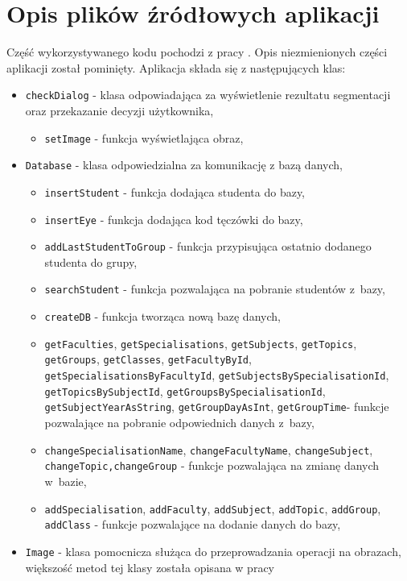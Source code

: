 \chapter{Opis plików źródłowych aplikacji}
\label{cha:opiskodow}

Część wykorzystywanego kodu pochodzi z pracy \cite{Gl11}. Opis niezmienionych części aplikacji został pominięty. Aplikacja składa się z następujących klas:
\begin{itemize}
\item \verb!checkDialog! - klasa odpowiadająca za wyświetlenie rezultatu segmentacji oraz przekazanie decyzji użytkownika,
\begin{itemize}
\item \verb!setImage! - funkcja wyświetlająca obraz,
\end{itemize}
\item \verb!Database! - klasa odpowiedzialna za komunikację z bazą danych,
\begin{itemize}
\item \verb!insertStudent! - funkcja dodająca studenta do bazy,
\item \verb!insertEye! - funkcja dodająca kod tęczówki do bazy,
\item \verb!addLastStudentToGroup! - funkcja przypisująca ostatnio dodanego studenta do grupy,
\item \verb!searchStudent! - funkcja pozwalająca na pobranie studentów z~bazy,
\item \verb!createDB! - funkcja tworząca nową bazę danych,
\item \verb!getFaculties!, \verb!getSpecialisations!, \verb!getSubjects!, \verb!getTopics!, \verb!getGroups!, \verb!getClasses!, \verb!getFacultyById!, \verb!getSpecialisationsByFacultyId!, \verb!getSubjectsBySpecialisationId!, \verb!getTopicsBySubjectId!, \verb!getGroupsBySpecialisationId!, \verb!getSubjectYearAsString!, \verb!getGroupDayAsInt!, \verb!getGroupTime!- funkcje pozwalające na pobranie odpowiednich danych z~bazy,
\item \verb!changeSpecialisationName!, \verb!changeFacultyName!, \verb!changeSubject!, \verb!changeTopic,changeGroup! - funkcje pozwalająca na zmianę danych w~bazie,
\item \verb!addSpecialisation!, \verb!addFaculty!, \verb!addSubject!, \verb!addTopic!, \verb!addGroup!, \verb!addClass! - funkcje pozwalające na dodanie danych do bazy,
\end{itemize}
\item \verb!Image! - klasa pomocnicza służąca do przeprowadzania operacji na obrazach, większość metod tej klasy została opisana w pracy \cite{Gl11}

\end{itemize}
